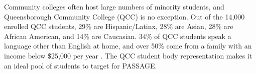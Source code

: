 \documentclass[12pt]{article}
\begin{document}


	
Community colleges often host large numbers of minority students, and Queensborough Community College (QCC) is no exception.  Out of the 14,000 enrolled QCC students, 29\% are Hispanic/Latinx, 28\% are Asian, 28\% are African American, and 14\% are Caucasian.  34\% of QCC students speak a language other than English at home, and over 50\% come from a family with an income below \$25,000 per year \citep{QCCweb}. The QCC student body representation makes it an ideal pool of students to target for PASSAGE.
\end{document}

